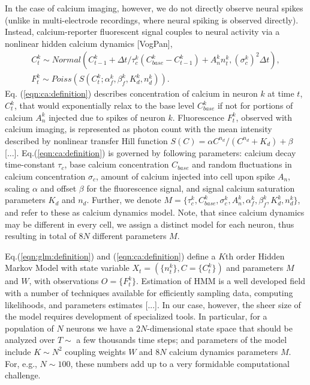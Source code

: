 \documentclass[amsmath,amssymb]{revtex4}
\begin{document}
In the case of calcium imaging, however, we do not directly observe neural spikes (unlike in multi-electrode recordings, where neural spiking is observed directly). Instead, calcium-reporter fluorescent signal couples to neural activity via a nonlinear hidden calcium dynamics [VogPan],
\begin{equation}\label{eqn:ca:definition}
\begin{array}{l}
C^k_t \sim Normal(C^k_{t-1} + \Delta t/\tau^k_c (C^k_{base}-C^k_{t-1}) + A^k_n n^k_t,(\sigma^k_c)^2\Delta t), \\
F^k_t \sim Poiss( S(C^k_t;\alpha^k_f,\beta^k_f,K^k_d,n^k_d) ).
\end{array}
\end{equation}
Eq. (\ref{eqn:ca:definition}) describes concentration of calcium in neuron $k$ at time $t$, $C^k_t$, that would exponentially relax to the base level $C^k_{base}$ if not for portions of calcium $A^k_n$ injected due to  spikes of neuron $k$. Fluorescence $F^k_t$, observed with calcium imaging, is represented as photon count with the mean intensity described by nonlinear transfer Hill function $S(C)=\alpha C^{n_d}/(C^{n_d}+K_d) + \beta$ [...]. Eq.(\ref{eqn:ca:definition}) is governed by following parameters: calcium decay time-constant $\tau_c$, base calcium concentration $C_{base}$ and random fluctuations in calcium concentration $\sigma_c$, amount of calcium injected into cell upon spike $A_n$, scaling $\alpha$ and offset $\beta$ for the fluorescence signal, and signal calcium saturation parameters $K_d$ and $n_d$.
Further, we denote $M=\{\tau^k_c, C^k_{base}, \sigma^k_c, A^k_n, \alpha^k_f, \beta^k_f, K^k_d, n^k_d\}$, and refer to these as calcium dynamics model. Note, that since calcium dynamics may be different in every cell, we assign a distinct model for each neuron, thus resulting in total of $8N$ different parameters $M$.

Eq.(\ref{eqn:glm:definition}) and (\ref{eqn:ca:definition}) define a $K$th order Hidden Markov Model with state variable $X_t=(\{n^k_t\},C=\{C^k_t\})$ and parameters $M$ and $W$, with observations $O=\{F^k_t\}$. Estimation of HMM is a well developed field with a number of techniques available for efficiently sampling data, computing likelihoods, and parameters estimates [...]. In our case, however, the sheer size of the model requires development of specialized tools. In particular, for a population of $N$ neurons we have a $2N$-dimensional state space that should be analyzed over $T\sim$ a few thousands time steps; and parameters of the model include $K\sim N^2$ coupling weights $W$ and $8N$ calcium dynamics parameters $M$. For, e.g., $N\sim 100$, these numbers add up to a very formidable computational challenge.
\end{document}

